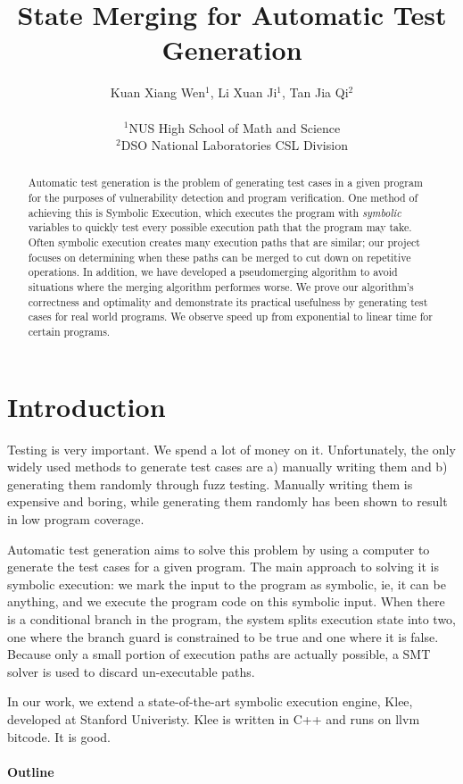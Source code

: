\documentclass[12pt,a4paper]{article}
\title{State Merging for Automatic Test Generation}
\date{}
\author{
Kuan Xiang Wen$^{1}$, Li Xuan Ji$^{1}$, Tan Jia Qi$^{2}$\\
\vspace{1 mm} \\
\small{$^{1}$NUS High School of Math and Science}\\
\small{$^{2}$DSO National Laboratories CSL Division}
}
\begin{document}
\maketitle
\begin{abstract}
Automatic test generation is the problem of generating test cases in a given program for the purposes of vulnerability detection and program verification. One method of achieving this is Symbolic Execution, which executes the program with \emph{symbolic} variables to quickly test every possible execution path that the program may take. Often symbolic execution creates many execution paths that are similar; our project focuses on determining when these paths can be merged to cut down on repetitive operations. In addition, we have developed a pseudomerging algorithm to avoid situations where the merging algorithm performes worse. We prove our algorithm's correctness and optimality and demonstrate its practical usefulness by generating test cases for real world programs. We observe speed up from exponential to linear time for certain programs.
\end{abstract}

\section{Introduction}
Testing is very important. We spend a lot of money on it. Unfortunately, the only widely used methods to generate test cases are a) manually writing them and b) generating them randomly through fuzz testing. Manually writing them is expensive and boring, while generating them randomly has been shown to result in low program coverage. 

Automatic test generation aims to solve this problem by using a computer to generate the test cases for a given program. The main approach to solving it is symbolic execution: we mark the input to the program as symbolic, ie, it can be anything, and we execute the program code on this symbolic input. When there is a conditional branch in the program, the system splits execution state into two, one where the branch guard is constrained to be true and one where it is false. Because only a small portion of execution paths are actually possible, a SMT solver is used to discard un-executable paths. 

In our work, we extend a state-of-the-art symbolic execution engine, Klee, developed at Stanford Univeristy. Klee is written in C++ and runs on llvm bitcode. It is good.

\paragraph{Outline}
\end{document}
